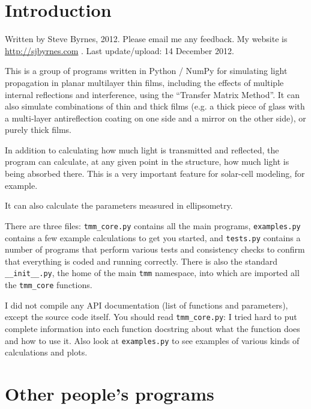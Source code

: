 \documentclass[12pt]{article}
\renewcommand{\(}{\left(}
\renewcommand{\)}{\right)}
\begin{document}
\section{Introduction}

Written by Steve Byrnes, 2012. Please email me any feedback. My website is \url{http://sjbyrnes.com} . Last update/upload: 14 December 2012.

This is a group of programs written in Python / NumPy for simulating light propagation in planar multilayer thin films, including the effects of multiple internal reflections and interference, using the ``Transfer Matrix Method''. It can also simulate combinations of thin and thick films (e.g. a thick piece of glass with a multi-layer antireflection coating on one side and a mirror on the other side), or purely thick films.

In addition to calculating how much light is transmitted and reflected, the program can calculate, at any given point in the structure, how much light is being absorbed there. This is a very important feature for solar-cell modeling, for example.

It can also calculate the parameters measured in ellipsometry.

There are three files: \verb=tmm_core.py= contains all the main programs, \verb=examples.py= contains a few example calculations to get you started, and \verb=tests.py= contains a number of programs that perform various tests and consistency checks to confirm that everything is coded and running correctly. There is also the standard \verb=__init__.py=, the home of the main \verb=tmm= namespace, into which are imported all the \verb=tmm_core= functions.

I did not compile any API documentation (list of functions and parameters), except the source code itself. You should read \verb=tmm_core.py=: I tried hard to put complete information into each function docstring about what the function does and how to use it. Also look at \verb=examples.py= to see examples of various kinds of calculations and plots.

\section{Other people's programs}
\end{document}
